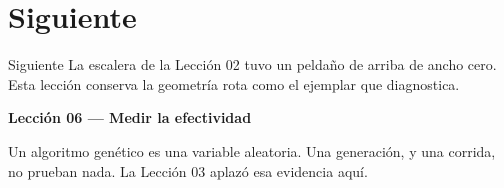 \section{Siguiente}

\begin{frame}{Siguiente}
La escalera de la Lección 02 tuvo un peldaño de arriba de ancho cero. Esta lección conserva la geometría rota como el ejemplar que diagnostica.

\vspace{0.8em}
\textbf{Lección 06 --- Medir la efectividad}

Un algoritmo genético es una variable aleatoria. Una generación, y una corrida, no prueban nada. La Lección 03 aplazó esa evidencia aquí.
\end{frame}

